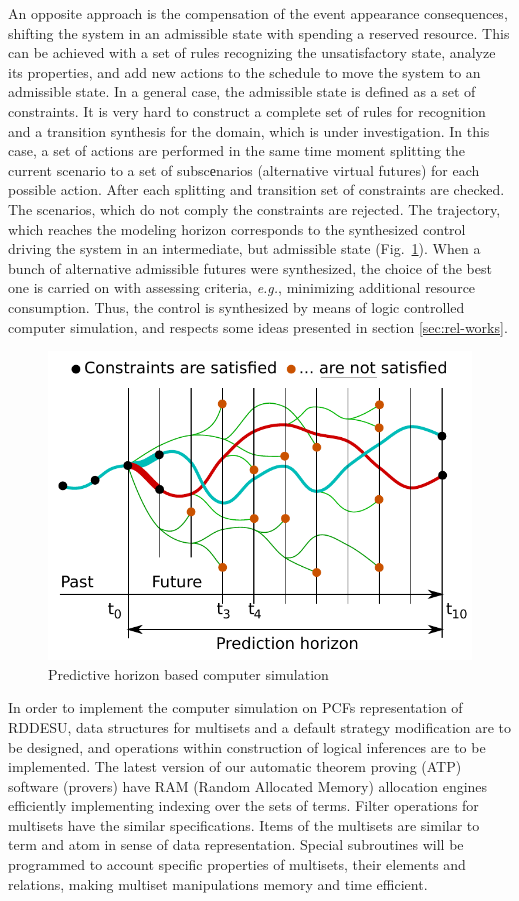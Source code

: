 \documentclass[conference,a4paper]{IEEEtran}
\begin{document}
An opposite approach is the compensation of the event appearance consequences, shifting the system in an admissible state with spending a reserved resource. This can be achieved with a set of rules recognizing the unsatisfactory state, analyze its properties, and add new actions to the schedule to move the system to an admissible state. In a general case, the admissible state is defined as a set of constraints. It is very hard to construct a complete set of rules for recognition and a transition synthesis for the domain, which is under investigation. In this case, a set of actions are performed in the same time moment splitting the current scenario to a set of subscеnarios (alternative virtual futures) for each possible action. After each splitting and transition set of constraints are checked. The scenarios, which do not comply the constraints are rejected. The trajectory, which reaches the modeling horizon corresponds to the synthesized control driving the system in an intermediate, but admissible state (Fig.~\ref{fig:hor}). When a bunch of alternative admissible futures were synthesized, the choice of the best one is carried on with assessing criteria, \emph{e.g.}, minimizing additional resource consumption. Thus, the control is synthesized by means of logic controlled computer simulation, and respects some ideas presented in section \ref{sec:rel-works}.

\begin{figure}[t]
  \centering
  \includegraphics[width=0.7\linewidth]{pics/predictive-horizon.pdf}
  \caption{Predictive horizon based computer simulation}
  \label{fig:hor}
\end{figure}

In order to implement the computer simulation on PCFs representation of RDDESU, data structures for multisets and a default strategy modification are to be designed, and operations within construction of logical inferences are to be implemented.  The latest version of our automatic theorem proving (ATP) software (provers) have RAM (Random Allocated Memory) allocation engines efficiently implementing indexing over the sets of terms. Filter operations for multisets have the similar specifications. Items of the multisets are similar to term and atom in sense of data representation. Special subroutines will be programmed to account specific properties of multisets, their elements and relations, making multiset manipulations memory and time efficient.
\end{document}
